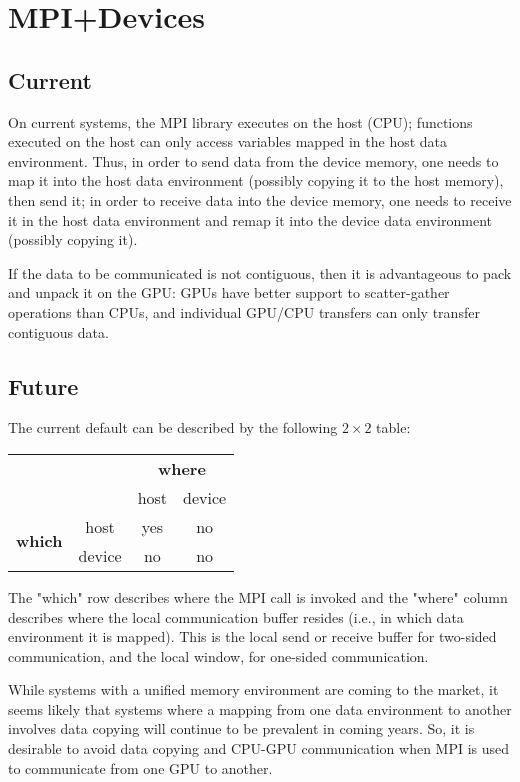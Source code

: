 \section{MPI+Devices}

\subsection{Current}
On current systems, the MPI library executes on the host (CPU); functions 
executed on the host can only access variables mapped in the host data 
environment. Thus, in order to send data from the device memory, one needs to 
map 
it into the host data environment (possibly copying it to the host memory), 
then send it; in order to receive data into the device memory, one needs to 
receive it in the host data environment and remap it into the device data 
environment (possibly copying it).

If the data to be communicated is not contiguous, then it is
advantageous to pack and unpack it on the GPU: GPUs have better support to 
scatter-gather operations than CPUs, and individual GPU/CPU transfers can only 
transfer contiguous data.


\subsection{Future}

The current default can be described by the following $2 \times 2$ table:

\begin{table}[H]
	\begin{tabular}{|c|c|c|c|}
		\cline{3-4}
		\multicolumn{2}{c|}{} & \multicolumn{2}{c|}{\textbf{where}} \\
		\cline{3-4}
		\multicolumn{2}{c|}{} & host & device \\
		\hline
		\multirow{2}{30 pt}{\textbf{which}} & host & yes & no \\
		\cline{2-4}
		& device & no & no \\
		\hline
	\end{tabular}
\end{table}

The "which" row describes where the MPI call is invoked and the "where" column 
describes where the local communication buffer resides (i.e., in which data 
environment it is mapped). This is the local send or receive buffer for 
two-sided communication, and the local window, for one-sided communication.

While systems with a unified memory environment are coming to the market, it 
seems likely that systems where a mapping from one data environment to another 
involves data copying will continue 
to be prevalent in coming years. So, it is desirable to avoid data copying and 
CPU-GPU communication when MPI is used to communicate from one GPU to another.

